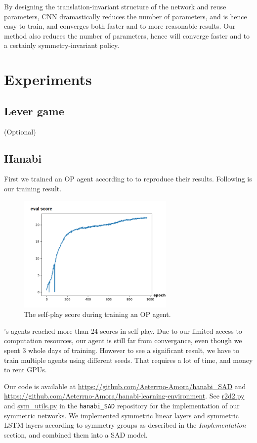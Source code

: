 \documentclass[12pt]{article}
\begin{document}
\begin{spacing}{1.15}
By designing the translation-invariant structure of the network and reuse parameters, CNN dramastically reduces the number of parameters, and is hence easy to train, and converges both faster and to more reasonable results. Our method also reduces the number of parameters, hence will converge faster and to a certainly symmetry-invariant policy.

\section{Experiments}

\subsection{Lever game}
(Optional)

\subsection{Hanabi}

First we trained an OP agent according to \cite{hu2020other} to reproduce their results. Following is our training result.

\begin{figure}[H]
\centerline{\includegraphics[width=3in]{train.png}}
\caption{The self-play score during training an OP agent.}
\label{FigTrain}
\end{figure}

\cite{hu2020other}'s agents reached more than 24 scores in self-play. Due to our limited access to computation resources, our agent is still far from convergance, even though we spent 3 whole days of training. However to see a significant result, we have to train multiple agents using different seeds. That requires a lot of time, and money to rent GPUs.

Our code is available at \url{https://github.com/Aeterrno-Amora/hanabi_SAD} and \url{https://github.com/Aeterrno-Amora/hanabi-learning-environment}. See \href{https://github.com/Aeterrno-Amora/hanabi_SAD/blob/symnet-dev/pyhanabi/r2d2.py}{r2d2.py} and \href{https://github.com/Aeterrno-Amora/hanabi_SAD/blob/symnet-dev/pyhanabi/sym_utils.py}{sym\_utils.py} in the \verb|hanabi_SAD| repository for the implementation of our symmetric networks. We implemented symmetric linear layers and symmetric LSTM layers according to symmetry groups as described in the \textsl{Implementation} section, and combined them into a SAD model.


\end{spacing}
\end{document}
